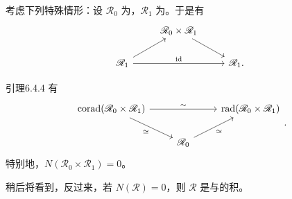 考虑下列特殊情形：设 $\mathscr R_0$ 为，$\mathscr R_1$ 为。于是有
\[\begin{tikzcd}
&\mathscr R_0\times\mathscr R_1\arrow[dr]&\\
\mathscr R_1\arrow[ur]\arrow[rr,"\mathrm{id}"]&&\mathscr R_1.
\end{tikzcd}\]
\begin{SGAresult}{引理}{6.4.4}
有
\[\begin{tikzcd}
\operatorname{corad}(\mathscr R_0\times\mathscr R_1)\arrow[rr,"\sim"]\arrow[dr,"\simeq"']&&\operatorname{rad}(\mathscr R_0\times\mathscr R_1)\\
&\mathscr R_0\arrow[ur,"\simeq"']&
\end{tikzcd}.\]
特别地，$N(\mathscr R_0\times\mathscr R_1)=0$。
\end{SGAresult}
稍后将看到，反过来，若 $N(\mathscr R)=0$，则 $\mathscr R$ 是与的积。


